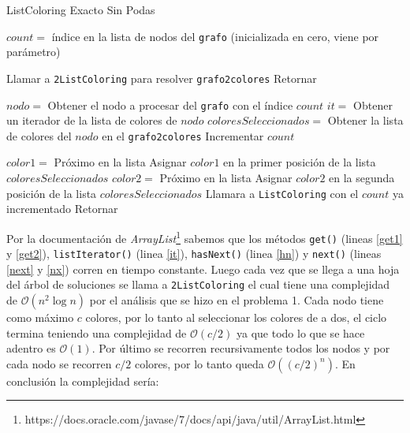 \begin{algorithm}[H]
\caption{ListColoring Exacto Sin Podas}
\label{lce}
\begin{algorithmic}[1] 

\STATE $count = $ índice en la lista de nodos del \texttt{grafo} (inicializada en cero, viene por parámetro)

	\STATE Llamar a \texttt{2ListColoring} para resolver \texttt{grafo2colores}  %
	\STATE Retornar 
\ENDIF

\STATE $nodo = $ Obtener el nodo a procesar del \texttt{grafo} con el índice $count$  \label{get1}
\STATE $it = $ Obtener un iterador de la lista de colores de $nodo$  \label{it}
\STATE $coloresSeleccionados = $ Obtener la lista de colores del $nodo$ en el \texttt{grafo2colores}  \label{get2}
\STATE Incrementar $count$ 

 \label{hn}
	\STATE $color1 = $ Próximo en la lista  \label{next}
	\STATE Asignar $color1$ en la primer posición de la lista $coloresSeleccionados$ 
		\STATE $color2 = $ Próximo en la lista  \label{nx}
		\STATE Asignar $color2$ en la segunda posición de la lista $coloresSeleccionados$ 
	\ENDIF
	\STATE Llamara a \texttt{ListColoring} con el $count$ ya incrementado
\ENDWHILE
\STATE Retornar
\end{algorithmic}
\end{algorithm}
\leavevmode
\newline
Por la documentación de \emph{ArrayList}\footnote{https://docs.oracle.com/javase/7/docs/api/java/util/ArrayList.html} sabemos que los métodos \texttt{get()} (lineas \ref{get1} y \ref{get2}), \texttt{listIterator()} (linea \ref{it}), \texttt{hasNext()} (linea \ref{hn}) y \texttt{next()} (lineas \ref{next} y \ref{nx}) corren en tiempo constante. Luego cada vez que se llega a una hoja del árbol de soluciones se llama a \texttt{2ListColoring} el cual tiene una complejidad de $\mathcal{O}(n^2 \log{n})$ por el análisis que se hizo en el problema 1. Cada nodo tiene como máximo $c$ colores, por lo tanto al seleccionar los colores de a dos, el ciclo termina teniendo una complejidad de $\mathcal{O}(c/2)$ ya que todo lo que se hace adentro es $\mathcal{O}(1)$. Por último se recorren recursivamente todos los nodos y por cada nodo se recorren $c/2$ colores, por lo tanto queda $\mathcal{O}((c/2)^n)$. En conclusión la complejidad sería:

